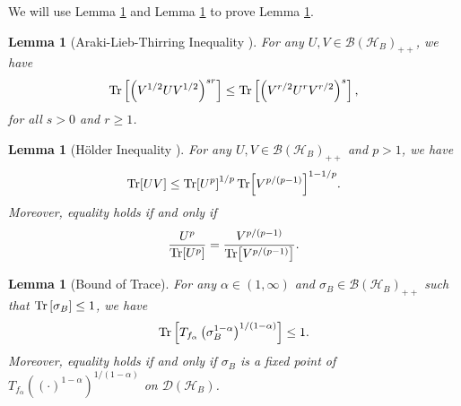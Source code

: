 \documentclass{article}
\newtheorem{lemma}[theorem]{Lemma}
\begin{document}
We will use Lemma \ref{ineq:Araki} and Lemma \ref{ineq:HolderEq} to prove Lemma \ref{ineq:TraceBound}.
\begin{lemma}[{Araki-Lieb-Thirring Inequality \cite{Araki1990}}]
\label{ineq:Araki}
For any $U,V\in\mathcal{B}\left(\mathcal{H}_B\right)_{++}$, we have 
\begin{align}
    \Tr\left[\left(V^{1/2}UV^{1/2}\right)^{sr}\right]\leq\Tr\left[\left(V^{r/2} U^r V^{r/2}\right)^{s}\right],
\end{align}
for all $s>0$ and $r\geq 1$.
\end{lemma}
\begin{lemma}[{H\"older Inequality \cite{Larotonda2018}}]
    \label{ineq:HolderEq}
    For any $U,V\in\mathcal{B}\left(\mathcal{H}_B\right)_{++}$ and $p>1$, we have
    \begin{align}
        \Tr[UV]\leq\Tr[U^{p}]^{1/p}\Tr[V^{p/(p-1)}]^{1-1/p}.
    \end{align}
    Moreover, equality holds if and only if 
    \begin{align}
        \frac{U^p}{\Tr[U^p]}=\frac{V^{p/(p-1)}}{\Tr[V^{p/(p-1)}]}.
    \end{align}
\end{lemma}
\begin{lemma}[{Bound of Trace}]
\label{ineq:TraceBound}
For any $\alpha\in(1,\infty)$ and $\sigma_B\in\mathcal{B}\left(\mathcal{H}_B\right)_{++}$ such that $\Tr\left[\sigma_B\right]\leq 1$, we have 
\begin{align}
    \Tr\left[T_{f_{\alpha}}\left(\sigma_B^{1-\alpha}\right)^{1/(1-\alpha)}\right]\leq 1.
\end{align}
Moreover, equality holds if and only if 
$\sigma_B$ is a fixed point of $T_{f_\alpha}\left((\cdot)^{1-\alpha}\right)^{1/(1-\alpha)}$ on $\mathcal{D} ( \mathcal{H}_B )$.
\end{lemma}
\end{document}
